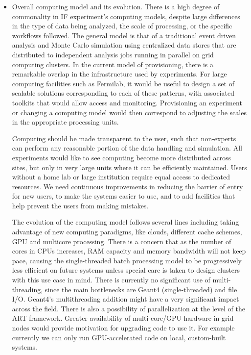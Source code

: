\begin{itemize}
\item Overall computing model and its evolution.  There is a high degree of
commonality in IF experiment's computing models, despite large differences in
the type of data being analyzed, the scale of processing, or the specific
workflows followed.   The general model is that of a traditional event driven
analysis and Monte Carlo simulation using centralized data stores that are
distributed to independent analysis jobs running in parallel on grid computing
clusters.  In the current model of provisioning, there is a remarkable overlap
in the infrastructure used by experiments. For large computing facilities such
as Fermilab, it would be useful to design a set of scalable solutions
corresponding to each of these patterns, with associated toolkits that would
allow access and monitoring. Provisioning an experiment or changing a
computing model would then correspond to adjusting the scales in the
appropriate processing units.

Computing should be made transparent to the user, such that non-experts can
perform any reasonable portion of the data handling and simulation. All
experiments would like to see computing become more distributed across sites,
but only in very large units where it can be efficiently maintained.  Users
without a home lab or large institution require equal access to dedicated
resources. We need  continuous improvements in reducing the barrier of entry
for new users, to make the systems easier to use, and to add facilities that
help prevent the users from making mistakes.

The evolution of the computing model follows several lines including taking
advantage of new computing paradigms, like clouds, different cache schemes,
GPU and multicore processing. There is a concern that as the number of cores
in CPUs increases, RAM capacity and memory bandwidth will not keep pace,
causing the single-threaded batch processing model to be progressively less
efficient on future systems unless special care is taken to design clusters
with this use case in mind. There is currently no significant use of multi-
threading, since the main bottlenecks are Geant4 (single-threaded) and file
I/O. Geant4's multithreading addition might have a very significant impact
across the field. There is also a possibility of parallelization at the level
of the ART framework. Greater availability of multi-core/GPU hardware in grid
nodes would provide motivation for upgrading code to use it. For example
currently we can only run GPU-accelerated code on local, custom-built systems.

\end{itemize}

